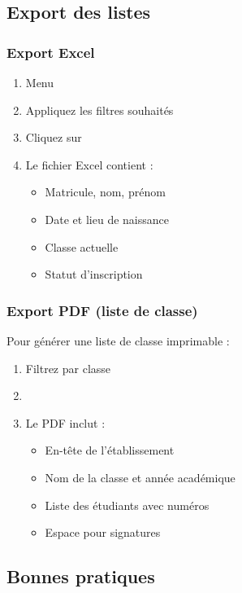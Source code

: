 \subsection{Export des listes}

\subsubsection{Export Excel}

\begin{enumerate}[leftmargin=*]
    \item Menu 
    \item Appliquez les filtres souhaités
    \item Cliquez sur 
    \item Le fichier Excel contient :
    \begin{itemize}
        \item Matricule, nom, prénom
        \item Date et lieu de naissance
        \item Classe actuelle
        \item Statut d'inscription
    \end{itemize}
\end{enumerate}

\subsubsection{Export PDF (liste de classe)}

Pour générer une liste de classe imprimable :

\begin{enumerate}[leftmargin=*]
    \item Filtrez par classe
    \item {}
    \item Le PDF inclut :
    \begin{itemize}
        \item En-tête de l'établissement
        \item Nom de la classe et année académique
        \item Liste des étudiants avec numéros
        \item Espace pour signatures
    \end{itemize}
\end{enumerate}

\subsection{Bonnes pratiques}

